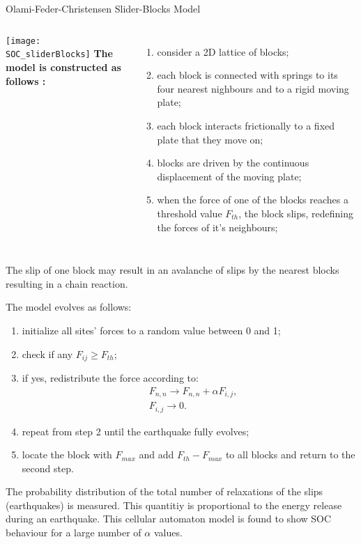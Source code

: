 \begin{frame}{Olami-Feder-Christensen Slider-Blocks Model}

\begin{columns}
             \centering
             \texttt{[image: SOC\_sliderBlocks]}
              \textbf{The model is constructed as follows :}
               \begin{enumerate}
	\item consider a 2D lattice of blocks;
	\item each block is connected with springs to its four nearest nighbours and to a rigid moving plate;
	\item each block interacts frictionally to a fixed plate that they move on;
	\item blocks are driven by the continuous displacement of the moving plate;
	\item when the force of one of the blocks reaches a threshold value $F_{th}$, the block slips, redefining the forces of it's neighbours;
	
				\end{enumerate}

         \end{columns} 

\vspace{5mm} 

	The slip of one block may result in an avalanche of slips by the nearest blocks resulting in a chain reaction.
\end{frame}


\begin{frame}
The model evolves as follows:
\begin{enumerate}
	\item initialize all sites' forces to a random value between 0 and 1;
	\item check if any $F_{ij} \geq F_{th}$;
	\item if yes, redistribute the force according to:
	\begin{align}
	&F_{n,n} \to F_{n,n} + \alpha F_{i,j},\\
	&F_{i,j} \to 0.
	\end{align}
	\item repeat from step 2 until the earthquake fully evolves;
	\item locate the block with $F_{max}$ and add $F_{th}-F_{max}$ to all blocks and return to the second step.
\end{enumerate}
The probability distribution of the total number of relaxations of the slips (earthquakes) is measured. This quantitiy is proportional to the energy release during an earthquake. This cellular automaton model is found to show SOC behaviour for a large number of $\alpha$ values.\par 
\end{frame}


